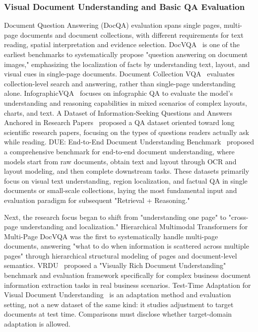\subsubsection{Visual Document Understanding and Basic QA Evaluation}

Document Question Answering (DocQA) evaluation spans single pages, multi-page documents and document collections, with different requirements for text reading, spatial interpretation and evidence selection. DocVQA~\cite{docvqa2020} is one of the earliest benchmarks to systematically propose "question answering on document images," emphasizing the localization of facts by understanding text, layout, and visual cues in single-page documents. Document Collection VQA~\cite{doccollectionvqa2021} evaluates collection-level search and answering, rather than single-page understanding alone. InfographicVQA~\cite{infographicvqa2021} focuses on infographic QA to evaluate the model's understanding and reasoning capabilities in mixed scenarios of complex layouts, charts, and text. A Dataset of Information-Seeking Questions and Answers Anchored in Research Papers~\cite{infoseekqa2021} proposed a QA dataset oriented toward long scientific research papers, focusing on the types of questions readers actually ask while reading. DUE: End-to-End Document Understanding Benchmark~\cite{due2021} proposed a comprehensive benchmark for end-to-end document understanding, where models start from raw documents, obtain text and layout through OCR and layout modeling, and then complete downstream tasks. These datasets primarily focus on visual text understanding, region localization, and factual QA in single documents or small-scale collections, laying the most fundamental input and evaluation paradigm for subsequent "Retrieval + Reasoning."

Next, the research focus began to shift from "understanding one page" to "cross-page understanding and localization." Hierarchical Multimodal Transformers for Multi-Page DocVQA \cite{tito2023hierarchicalmultimodaltransformersmultipage} was the first to systematically handle multi-page documents, answering "what to do when information is scattered across multiple pages" through hierarchical structural modeling of pages and document-level semantics. VRDU~\cite{vrdu2023} proposed a "Visually Rich Document Understanding" benchmark and evaluation framework specifically for complex business document information extraction tasks in real business scenarios. Test-Time Adaptation for Visual Document Understanding~\cite{tta-vdu2023} is an adaptation method and evaluation setting, not a new dataset of the same kind: it studies adjustment to target documents at test time. Comparisons must disclose whether target-domain adaptation is allowed.

